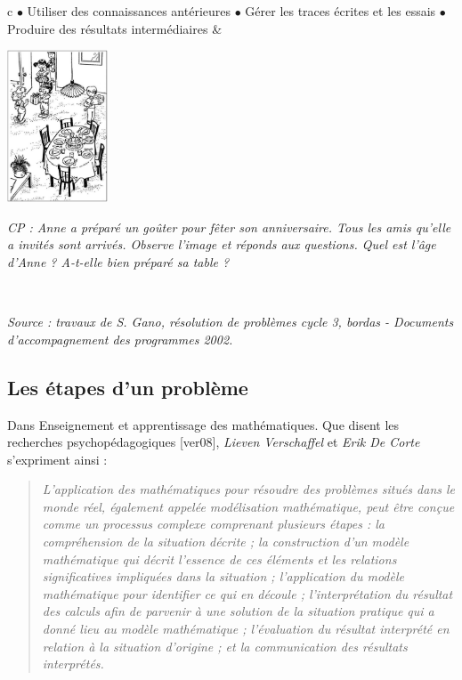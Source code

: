 {\begin{CLtableau}{\linewidth}{4}{c}
{   $\bullet$ Utiliser des connaissances antérieures \newline  
   $\bullet$ Gérer les traces écrites et les essais \newline
   $\bullet$ Produire des résultats intermédiaires}
   &
   \parbox{3cm}{\includegraphics[width=3cm]{Nombres_et_calculs_did/Images/Num2_cours_anniversaire}}
   \parbox{5cm}{\it CP : Anne a préparé un goûter pour fêter son anniversaire. Tous les amis qu’elle a invités sont arrivés. Observe l’image et réponds aux questions. Quel est l'âge d'Anne ? A-t-elle bien préparé sa table ?} \\
   \hline
\end{CLtableau}}

\hfill{\it\small Source : travaux de S. Gano, résolution de problèmes cycle 3, bordas - Documents d'accompagnement des programmes 2002.}


\subsection{Les étapes d'un problème}

Dans \og Enseignement et apprentissage des mathématiques.
Que disent les recherches psychopédagogiques \fg{} [ver08], {\it Lieven Verschaffel} et {\it Erik De Corte}  s'expriment ainsi :
\begin{quote}
   \it L’application des mathématiques pour résoudre des problèmes situés dans le monde réel, également appelée modélisation mathématique, peut être conçue comme un processus complexe comprenant plusieurs étapes : la compréhension de la situation décrite ; la construction d’un modèle mathématique qui décrit l’essence de ces éléments et les relations significatives impliquées dans la situation ; l’application du modèle mathématique pour identifier ce qui en découle ; l’interprétation du résultat des calculs afin de parvenir à une solution de la situation pratique qui a donné lieu au modèle mathématique ; l’évaluation du résultat interprété en relation à la situation d’origine ; et la communication des résultats interprétés.
\end{quote}

